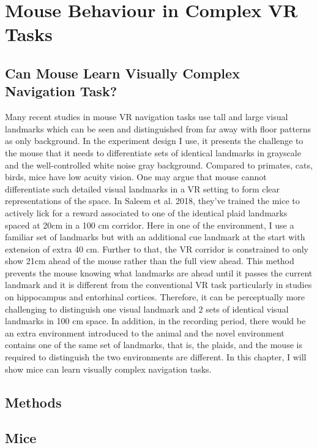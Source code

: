 \chapter{Mouse Behaviour in Complex VR Tasks}
\label{chapterlabel3}

\section{Can Mouse Learn Visually Complex Navigation Task?}
 Many recent studies in mouse VR navigation tasks use tall and large visual landmarks which can be seen and distinguished from far away with floor patterns as only background. In the experiment design I use, it presents the challenge to the mouse that it needs to differentiate sets of identical landmarks in grayscale and the well-controlled white noise gray background. Compared to primates, cats, birds, mice have low acuity vision. One may argue that mouse cannot differentiate such detailed visual landmarks in a VR setting to form clear representations of the space. In Saleem et al. 2018, they've trained the mice to actively lick for a reward associated to one of the identical plaid landmarks spaced at 20cm in a 100 cm corridor. Here in one of the environment, I use a familiar set of landmarks but with an additional cue landmark at the start with extension of extra 40 cm. Further to that, the VR corridor is constrained to only show 21cm ahead of the mouse rather than the full view ahead. This method prevents the mouse knowing what landmarks are ahead until it passes the current landmark and it is different from the conventional VR task particularly in studies on hippocampus and entorhinal cortices. Therefore, it can be perceptually more challenging to distinguish one visual landmark and 2 sets of identical visual landmarks in 100 cm space. In addition, in the recording period, there would be an extra environment introduced to the animal and the novel environment contains one of the same set of landmarks, that is, the plaids, and the mouse is required to distinguish the two environments are different. In this chapter, I will show mice can learn visually complex navigation tasks.

\section{Methods}

\section{Mice }

